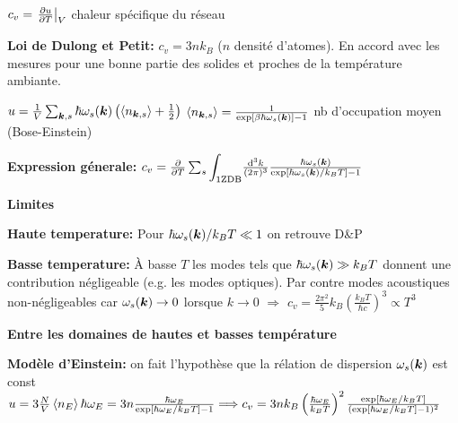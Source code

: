 \begin{squishlist}
    \item $c_v = \left.\D{T}{u}\right|_V$ chaleur spécifique du réseau
    \item \textbf{Loi de Dulong et Petit:} $c_v = 3n k_B$ ($n$ densité d'atomes). En accord avec les mesures pour une bonne partie des solides et proches de la température ambiante.
    \item $u = \frac{1}{V} \sum_{\vk,s} \hbar \omega_s(\vk) \left( \braket{n_{\vk,s}}+\frac{1}{2}\right)$ \quad $\braket{n_{\vk,s}} = \frac{1}{\exp[\beta \hbar \omega_s(\vk)]-1}$ nb d'occupation moyen (Bose-Einstein)
    \item \textbf{Expression génerale:} $c_v = \D{T}{} \sum_s {\displaystyle\int_{\text{1ZDB}}} \frac{\ud^3 k}{(2\pi)^3} \frac{\hbar \omega_s(\vk)}{\exp[\hbar \omega_s(\vk)/k_B T]-1}$
    
    \squishline

    \textbf{Limites }
    \item \textbf{Haute temperature:} Pour $\hbar \omega_s(\vk)/k_BT \ll 1$ on retrouve D\&P
    \item \textbf{Basse temperature:} À basse $T$ les modes tels que $\hbar \omega_s(\vk) \gg k_BT$ donnent une contribution négligeable (e.g. les modes optiques). Par contre modes acoustiques non-négligeables car $\omega_s(\vk) \rightarrow 0$ lorsque $k \rightarrow 0$ $\Longrightarrow$ $c_v = \frac{2\pi^2}{5}k_B \left(\frac{k_B T}{\hbar c}\right)^3 \propto T^3$
    
    \squishline

    \textbf{Entre les domaines de hautes et basses température}

    \item \textbf{Modèle d'Einstein:} on fait l'hypothèse que la rélation de dispersion $\omega_s(\vk)$ est const \\
    $u = 3 \frac{N}{V} \braket{n_E}\hbar \omega_E = 3n \frac{\hbar \omega_E}{\exp[\hbar \omega_E/k_BT]-1} \Longrightarrow c_v = 3nk_B \left(\frac{\hbar \omega_E}{k_BT}\right)^2 \frac{\exp[\hbar \omega_E /k_BT]}{(\exp[\hbar \omega_E /k_BT] - 1)^2}$


\end{squishlist}

